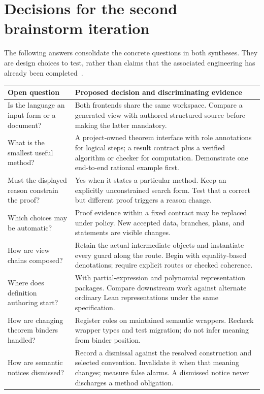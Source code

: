 \documentclass[11pt,a4paper]{article}
\theoremstyle{remark}
\begin{document}
\section{Decisions for the second brainstorm iteration}
\label{sec:decisions}
The following answers consolidate the concrete questions in both syntheses.
They are design choices to test, rather than claims that the associated engineering
has already been completed~\cite{synA,synB}.

\begin{longtable}{@{}L{.30\textwidth}L{.62\textwidth}@{}}
\toprule
Open question & Proposed decision and discriminating evidence \\
\midrule
\endhead
Is the language an input form or a document? & Both frontends share the same
workspace. Compare a generated view with authored structured source before
making the latter mandatory.\\
What is the smallest useful method? & A project-owned theorem interface with
role annotations for logical steps; a result contract plus a verified algorithm
or checker for computation. Demonstrate one end-to-end rational example first.\\
Must the displayed reason constrain the proof? & Yes when it states a particular
method. Keep an explicitly unconstrained search form. Test that a correct but
different proof triggers a reason change.\\
Which choices may be automatic? & Proof evidence within a fixed contract may be
replaced under policy. New accepted data, branches, plans, and statements are
visible changes.\\
How are view chains composed? & Retain the actual intermediate objects and
instantiate every guard along the route. Begin with equality-based denotations;
require explicit routes or checked coherence.\\
Where does definition authoring start? & With partial-expression and polynomial
representation packages. Compare downstream work against alternate ordinary
Lean representations under the same specification.\\
How are changing theorem binders handled? & Register roles on maintained semantic
wrappers. Recheck wrapper types and test migration; do not infer meaning from
binder position.\\
How are semantic notices dismissed? & Record a dismissal against the resolved
construction and selected convention. Invalidate it when that meaning changes;
measure false alarms. A dismissed notice never discharges a method obligation.\\

\end{longtable}
\end{document}

